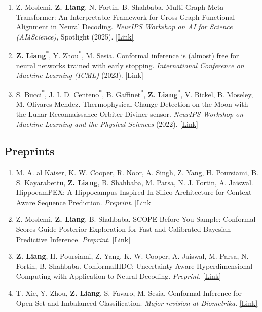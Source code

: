 \documentclass[11pt]{article}
\newcommand{\paperlink}[1]{\href{#1}{[Link]}}
\begin{document}
\begin{enumerate}[resume,itemsep=4pt,topsep=1pt]
  \item { Z. Moslemi, \textbf{Z. Liang}, N. Fortin, B. Shahbaba. Multi-Graph Meta-Transformer: An Interpretable Framework for Cross-Graph Functional Alignment in Neural Decoding. \textit{NeurIPS Workshop on AI for Science (AI4Science)}, Spotlight (2025). \paperlink{https://openreview.net/pdf/b80baee1e96105401fdc5397af5723ebdb7054a1.pdf}\par}

  \item \textbf{Z. Liang}\textsuperscript{*}, Y. Zhou\textsuperscript{*}, M. Sesia. Conformal inference is (almost) free for neural networks trained with early stopping. \textit{International Conference on Machine Learning (ICML)} (2023). \paperlink{https://proceedings.mlr.press/v202/liang23i.html}

  \item S. Bucci\textsuperscript{*}, J. I. D. Centeno\textsuperscript{*}, B. Gaffinet\textsuperscript{*}, \textbf{Z. Liang}\textsuperscript{*}, V. Bickel, B. Moseley, M. Olivares-Mendez. Thermophysical Change Detection on the Moon with the Lunar Reconnaissance Orbiter Diviner sensor. \textit{NeurIPS Workshop on Machine Learning and the Physical Sciences} (2022). \paperlink{https://ml4physicalsciences.github.io/2022/files/NeurIPS_ML4PS_2022_174.pdf}
\end{enumerate}

\subsection*{Preprints}

\begin{enumerate}[resume,itemsep=3pt,topsep=1pt]
  \item M. A. al Kaiser, K. W. Cooper, R. Noor, A. Singh, Z. Yang, H. Poursiami, B. S. Kayarabettu, \textbf{Z. Liang}, B. Shahbaba, M. Parsa, N. J. Fortin, A. Jaiswal. HippocamPEX: A Hippocampus-Inspired In-Silico Architecture for Context-Aware Sequence Prediction. \textit{Preprint}. \paperlink{https://arxiv.org/abs/2611.05415}

  \item Z. Moslemi, \textbf{Z. Liang}, B. Shahbaba. SCOPE Before You Sample: Conformal Scores Guide Posterior Exploration for Fast and Calibrated Bayesian Predictive Inference. \textit{Preprint}. \paperlink{https://arxiv.org/abs/2610.17146}

  \item \textbf{Z. Liang}, H. Poursiami, Z. Yang, K. W. Cooper, A. Jaiswal, M. Parsa, N. Fortin, B. Shahbaba. ConformalHDC: Uncertainty-Aware Hyperdimensional Computing with Application to Neural Decoding. \textit{Preprint}. \paperlink{https://arxiv.org/abs/2602.21446}

  \item T. Xie, Y. Zhou, \textbf{Z. Liang}, S. Favaro, M. Sesia. Conformal Inference for Open-Set and Imbalanced Classification. \textit{Major revision at Biometrika}. \paperlink{https://arxiv.org/abs/2510.13037}
\end{enumerate}
\end{document}
